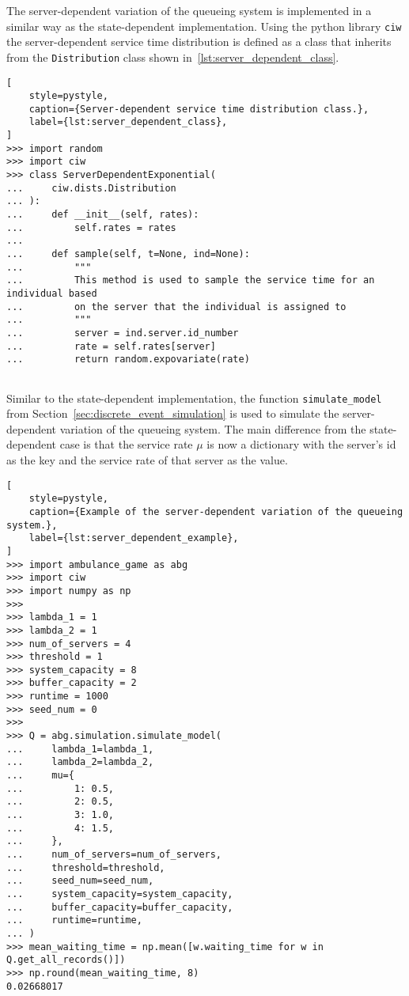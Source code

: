 The server-dependent variation of the queueing system is implemented in a
similar way as the state-dependent implementation.
Using the python library \texttt{ciw} the server-dependent service time
distribution is defined as a class that inherits from the
\texttt{Distribution} class shown in~\ref{lst:server_dependent_class}.

\begin{lstlisting}[
    style=pystyle,
    caption={Server-dependent service time distribution class.},
    label={lst:server_dependent_class},
]
>>> import random
>>> import ciw
>>> class ServerDependentExponential(
...     ciw.dists.Distribution
... ):
...     def __init__(self, rates):
...         self.rates = rates
... 
...     def sample(self, t=None, ind=None):
...         """
...         This method is used to sample the service time for an individual based
...         on the server that the individual is assigned to
...         """
...         server = ind.server.id_number
...         rate = self.rates[server]
...         return random.expovariate(rate)
    
\end{lstlisting}

Similar to the state-dependent implementation, the function
\texttt{simulate\_model} from Section~\ref{sec:discrete_event_simulation} is
used to simulate the server-dependent variation of the queueing system.
The main difference from the state-dependent case is that the service rate
\(\mu\) is now a dictionary with the server's id as the key and the service
rate of that server as the value.

\begin{lstlisting}[
    style=pystyle,
    caption={Example of the server-dependent variation of the queueing system.},
    label={lst:server_dependent_example},
]
>>> import ambulance_game as abg
>>> import ciw
>>> import numpy as np
>>>
>>> lambda_1 = 1
>>> lambda_2 = 1
>>> num_of_servers = 4
>>> threshold = 1
>>> system_capacity = 8
>>> buffer_capacity = 2
>>> runtime = 1000
>>> seed_num = 0
>>>
>>> Q = abg.simulation.simulate_model(
...     lambda_1=lambda_1,
...     lambda_2=lambda_2,
...     mu={
...         1: 0.5,
...         2: 0.5,
...         3: 1.0,
...         4: 1.5,
...     },
...     num_of_servers=num_of_servers,
...     threshold=threshold,
...     seed_num=seed_num,
...     system_capacity=system_capacity,
...     buffer_capacity=buffer_capacity,
...     runtime=runtime,
... )
>>> mean_waiting_time = np.mean([w.waiting_time for w in Q.get_all_records()])
>>> np.round(mean_waiting_time, 8)
0.02668017

\end{lstlisting}

